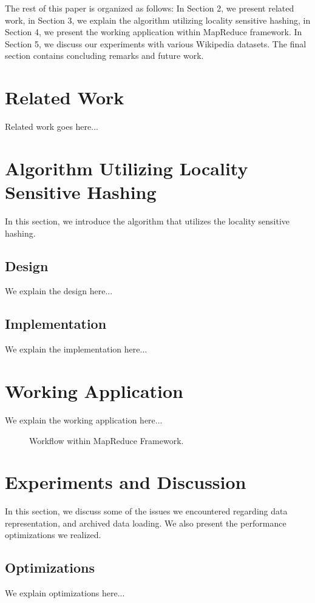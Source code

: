 \documentclass{acm_proc_article-sp}
\begin{document}
The rest of this paper is organized as follows: In Section 2, we present related work, in Section 3, we explain the algorithm utilizing locality sensitive hashing, in Section 4, we present the working application within MapReduce framework. In Section 5, we discuss our experiments with various Wikipedia datasets. The final section contains concluding remarks and future work.

\section{Related Work}
Related work goes here...

\section{Algorithm Utilizing Locality Sensitive Hashing}
In this section, we introduce the algorithm that utilizes the locality sensitive hashing.

\subsection{Design}
We explain the design here...

\subsection{Implementation}
We explain the implementation here...

\section{Working Application}
We explain the working application here...

\begin{figure}
\centering
{}
\caption{Workflow within MapReduce Framework.}
\end{figure}

\section{Experiments and Discussion}
In this section, we discuss some of the issues we encountered regarding data representation, and archived data loading. We also present the performance optimizations we realized.

\subsection{Optimizations}	 
We explain optimizations here...
\end{document}

